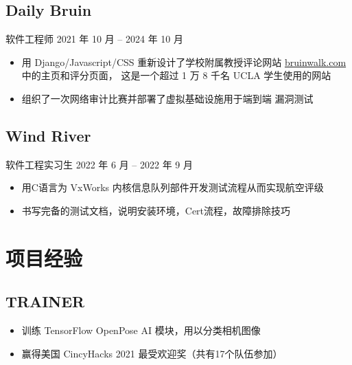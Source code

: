 \documentclass{article}
\begin{document}
\subsection*{Daily Bruin} 软件工程师
\hfill 2021 年 10 月 -- 2024 年 10 月
\begin{itemize}
  \item 用 Django/Javascript/CSS 重新设计了学校附属教授评论网站
        \href{https://bruinwalk.com/}{bruinwalk.com} 中的主页和评分页面， 这是一个超过 1 万 8 千名
        UCLA 学生使用的网站

  \item 组织了一次网络审计比赛并部署了虚拟基础设施用于端到端 漏洞测试
\end{itemize}

\subsection*{Wind River} 软件工程实习生
\hfill 2022 年 6 月 -- 2022 年 9 月
\begin{itemize}
  \item 用C语言为 VxWorks 内核信息队列部件开发测试流程从而实现航空评级

  \item 书写完备的测试文档，说明安装环境，Cert流程，故障排除技巧
\end{itemize}



\section*{项目经验}

\subsection*{TRAINER}
\begin{itemize}
  \item 训练 TensorFlow OpenPose AI 模块，用以分类相机图像

  \item 赢得美国 CincyHacks 2021 最受欢迎奖（共有17个队伍参加）
\end{itemize}
\end{document}

